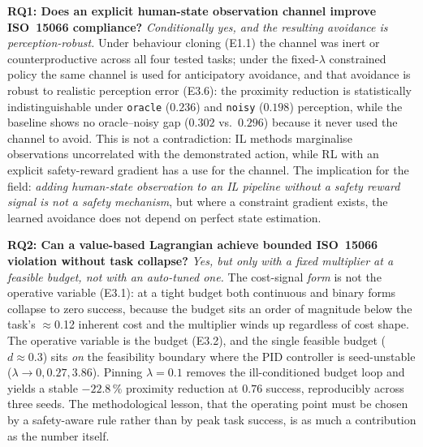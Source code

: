 \documentclass[11pt,a4paper]{report}
\newcommand{\iso}{ISO~15066}
\begin{document}
\textbf{RQ1: Does an explicit human-state observation channel
improve \iso{} compliance?} \emph{Conditionally yes, and the resulting
avoidance is perception-robust.} Under behaviour cloning (E1.1) the
channel was inert or counterproductive across all four tested tasks;
under the fixed-$\lambda$ constrained policy the same channel is used
for anticipatory avoidance, and that avoidance is robust to realistic
perception error (E3.6): the proximity reduction is statistically
indistinguishable under \texttt{oracle} ($0.236$) and \texttt{noisy}
($0.198$) perception, while the baseline shows no oracle--noisy gap
($0.302$ vs.\ $0.296$) because it never used the channel to avoid.
This is not a contradiction: IL methods marginalise observations
uncorrelated with the demonstrated action, while RL with an explicit
safety-reward gradient has a use for the channel. The implication for
the field: \emph{adding human-state observation to an IL pipeline
without a safety reward signal is not a safety mechanism}, but where a
constraint gradient exists, the learned avoidance does not depend on
perfect state estimation.

\textbf{RQ2: Can a value-based Lagrangian achieve bounded \iso{}
violation without task collapse?} \emph{Yes, but only with a fixed
multiplier at a feasible budget, not with an auto-tuned one.} The
cost-signal \emph{form} is not the operative variable (E3.1): at a
tight budget both continuous and binary forms collapse to zero
success, because the budget sits an order of magnitude below the
task's $\approx$0.12 inherent cost and the multiplier winds up
regardless of cost shape. The operative variable is the budget (E3.2),
and the single feasible budget ($d \approx 0.3$) sits \emph{on} the
feasibility boundary where the PID controller is seed-unstable
($\lambda \to 0, 0.27, 3.86$). Pinning $\lambda = 0.1$ removes the
ill-conditioned budget loop and yields a stable $-22.8\,\%$ proximity
reduction at $0.76$ success, reproducibly across three seeds. The
methodological lesson, that the operating point must be chosen by a
safety-aware rule rather than by peak task success, is as much a
contribution as the number itself.
\end{document}
